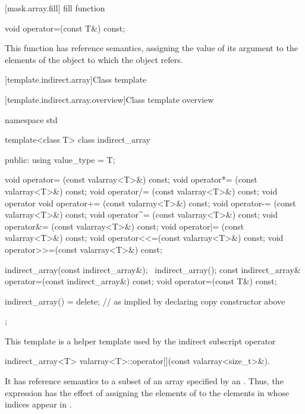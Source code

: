 [mask.array.fill]{ fill function}

%
\begin{itemdecl}
void operator=(const T&) const;
\end{itemdecl}

\begin{itemdescr}
\pnum
This function has reference semantics, assigning the value of its
argument to the elements of the
object to which the
object refers.
\end{itemdescr}

[template.indirect.array]{Class template }

[template.indirect.array.overview]{Class template  overview}

%
%
\begin{codeblock}
namespace std {
  template<class T> class indirect_array {
  public:
    using value_type = T;

    void operator=  (const valarray<T>&) const;
    void operator*= (const valarray<T>&) const;
    void operator/= (const valarray<T>&) const;
    void operator%
    void operator+= (const valarray<T>&) const;
    void operator-= (const valarray<T>&) const;
    void operator^= (const valarray<T>&) const;
    void operator&= (const valarray<T>&) const;
    void operator|= (const valarray<T>&) const;
    void operator<<=(const valarray<T>&) const;
    void operator>>=(const valarray<T>&) const;

    indirect_array(const indirect_array&);
    ~indirect_array();
    const indirect_array& operator=(const indirect_array&) const;
    void operator=(const T&) const;

    indirect_array() = delete;        // as implied by declaring copy constructor above
  };
}
\end{codeblock}

\pnum
This template is a helper template used by the indirect subscript operator

%
\begin{itemdecl}
indirect_array<T> valarray<T>::operator[](const valarray<size_t>&).
\end{itemdecl}

\pnum
It has reference semantics to a subset of an array specified by an
.
Thus, the expression
has the effect of assigning the elements of
to the elements in
whose indices appear in
.

